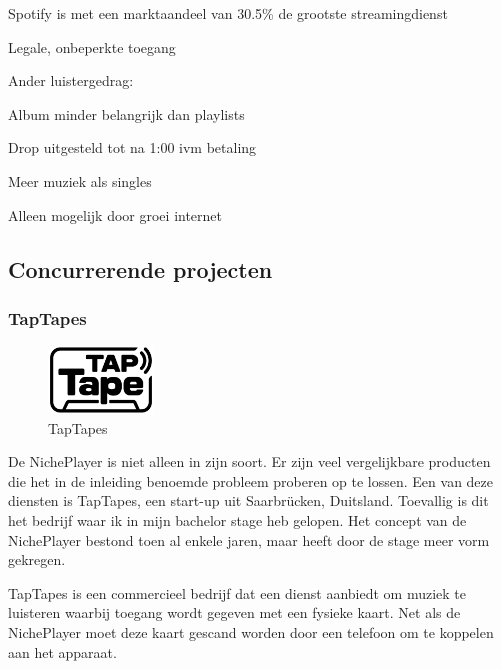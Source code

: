 
Spotify is met een marktaandeel van 30.5\% \citep{mulligan2022marketshares} de grootste streamingdienst 

\begin{todolist}
    \item Legale, onbeperkte toegang
    \item Ander luistergedrag: \begin{todolist}
        \item Album minder belangrijk dan playlists
        \item Drop uitgesteld tot na 1:00 ivm betaling
    \end{todolist}
    \item Meer muziek als singles
    \item Alleen mogelijk door groei internet
\end{todolist}

\subsection{Concurrerende projecten}
\subsubsection*{TapTapes}
\begin{figure}
    \centering
    \includegraphics[width=0.25\textwidth]{assets/critical-review/TapTapes.png}
    \caption{TapTapes}
    \label{fig:critical-review:TapTapes}
\end{figure}
De NichePlayer is niet alleen in zijn soort. Er zijn veel vergelijkbare producten die het in de inleiding benoemde probleem proberen op te lossen. Een van deze diensten is TapTapes, een start-up uit Saarbrücken, Duitsland. Toevallig is dit het bedrijf waar ik in mijn bachelor stage heb gelopen. Het concept van de NichePlayer bestond toen al enkele jaren, maar heeft door de stage meer vorm gekregen.

TapTapes is een commercieel bedrijf dat een dienst aanbiedt om muziek te luisteren waarbij toegang wordt gegeven met een fysieke kaart. Net als de NichePlayer moet deze kaart gescand worden door een telefoon om te koppelen aan het apparaat.

